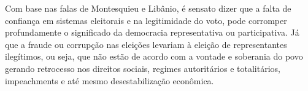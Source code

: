 Com base nas falas de Montesquieu e Libânio, é sensato dizer que a falta de confiança
em sistemas eleitorais e na legitimidade do voto, pode corromper profundamente
o significado da democracia representativa ou participativa. Já que a fraude 
ou corrupção nas eleições levariam à eleição de representantes ilegítimos, 
ou seja, que não estão de acordo com a vontade e soberania do povo gerando
retrocesso nos direitos sociais, regimes autoritários e totalitários, 
impeachments e até mesmo desestabilização econômica.\par


\clearpage